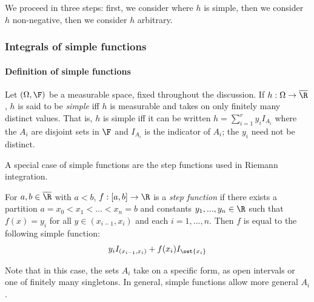 \documentclass{article} %
\begin{document}
 
 We proceed in three steps: first, we consider where $h$ is simple, then we consider $h$ non-negative, then we consider $h$ arbitrary. 



\subsubsection{Integrals of simple functions}

\paragraph{Definition of simple functions} 

\begin{definition}
Let $(\Omega, \F)$ be a measurable space, fixed throughout the discussion.  If $h : \Omega \to \overline{\R}$, $h$ is said to be \textit{simple} iff $h$ is measurable and takes on only finitely many distinct values.  That is, $h$ is simple iff it can be written $h = \sum_{i=1}^r y_i I_{A_i}$ where the $A_i$ are disjoint sets in $\F$ and $I_{A_i}$ is the indicator of $A_i$; the $y_i$ need not be distinct. 
\label{def:simple_function}	
\end{definition}

\begin{remark}{}
A special case of simple functions are the step functions used in Riemann integration. 


For $a,b \in \overline{\R}$ with $a<b$, $f : [a,b] \to \R$ is a \textit{step function} if there exists a partition $a = x_0 < x_1 < ... < x_n = b$ and constants $y_1, ..., y_n \in \R$ such that $f(x)=y_i$ for all $y \in (x_{i-1},x_i)$ and each $i=1,...,n$.  Then $f$ is equal to the following simple function:
\[ y_i I_{(x_{i-1}, x_i)} + f(x_i) I_{\set{x_i}}\]

Note that in this case, the sets $A_i$ take on a specific form, as open intervals or one of finitely many singletons.  In general, simple functions allow more general $A_i$. 

\label{rk:simple_functions_generalize_step_functions}
\end{remark}
\end{document}
